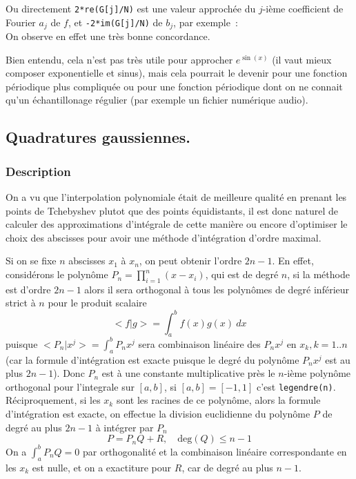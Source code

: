 \documentclass[a4paper,11pt]{article}
\begin{document}
\begin{giacjshere}
Ou directement \verb|2*re(G[j]/N)| est une valeur approch\'ee du
$j$-i\`eme coefficient de Fourier $a_j$ de $f$, et \verb|-2*im(G[j]/N)|
de $b_j$, par exemple~:\\
On observe en effet une tr\`es bonne concordance.

Bien entendu, cela n'est pas tr\`es utile pour approcher $e^{\sin(x)}$
(il vaut mieux composer exponentielle et sinus), 
mais cela pourrait le devenir pour une
fonction p\'eriodique plus compliqu\'ee ou pour une fonction
p\'eriodique dont on ne connait qu'un \'echantillonage r\'egulier
(par exemple un fichier num\'erique audio).

\subsection{Quadratures gaussiennes.}
\subsubsection{Description}
On a vu que l'interpolation polynomiale \'etait de meilleure
qualit\'e en prenant les points de Tchebyshev plutot que
des points \'equidistants, il est donc naturel de calculer
des approximations d'int\'egrale de cette mani\`ere
ou encore d'optimiser le choix des abscisses pour avoir
une m\'ethode d'int\'egration d'ordre maximal.

Si on se fixe $n$ abscisses $x_1$ \`a $x_n$, on peut obtenir l'ordre
$2n-1$. En effet, consid\'erons le polyn\^ome $P_n=\prod_{i=1}^n (x-x_i)$,
qui est de degr\'e $n$, si la m\'ethode est d'ordre $2n-1$ alors
il sera orthogonal \`a tous les polyn\^omes de degr\'e inf\'erieur
strict \`a $n$ pour le produit scalaire 
$$<f|g>=\int_a^b f(x) g(x) \ dx$$
puisque $<P_n|x^j>=\int_a^b P_n x^j $ sera combinaison lin\'eaire des
$P_n x^j$ en $x_k, k=1..n$ (car la formule d'int\'egration est exacte puisque le degr\'e
du polyn\^ome $P_nx^j$ est au plus $2n-1$). Donc $P_n$ est \`a une constante
multiplicative pr\`es le $n$-i\`eme polyn\^ome orthogonal pour
l'integrale sur $[a,b]$, si $[a,b]=[-1,1]$ c'est \verb|legendre(n)|.
R\'eciproquement, si les $x_k$ sont les racines de ce polyn\^ome,
alors la formule d'int\'egration est exacte, on effectue la division
euclidienne du polyn\^ome $P$ de degr\'e au plus $2n-1$ \`a
int\'egrer par $P_n$
$$ P= P_n Q + R , \quad \mbox{deg}(Q) \leq n-1 $$
On a $\int_a^b P_n Q=0$ par orthogonalit\'e et la combinaison
lin\'eaire correspondante en les $x_k$ est nulle, et on a exactiture
pour $R$, car de degr\'e au plus $n-1$.


\end{giacjshere}
\end{document}
